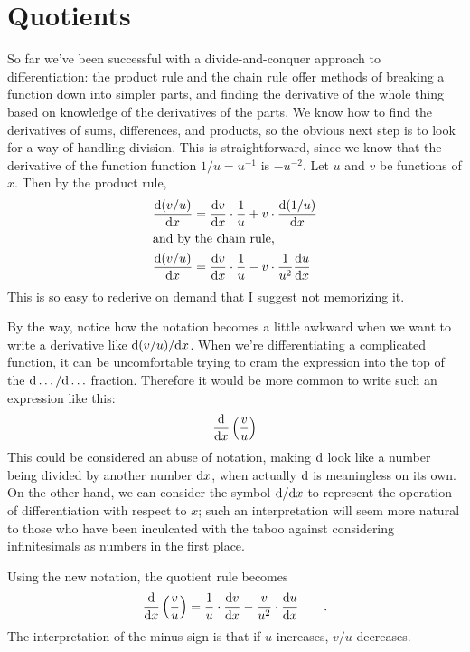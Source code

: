\section{Quotients}

So far we've been successful with a divide-and-conquer approach to differentiation:
the product rule and the chain rule offer methods of breaking a function down into
simpler parts, and finding the derivative of the whole thing based on knowledge of
the derivatives of the parts. We know how to find the derivatives of sums, differences,
and products, so the obvious next step is to look for a way of handling division.
This is straightforward, since we know that the derivative of the function function $1/u=u^{-1}$
is $-u^{-2}$.
Let $u$ and $v$ be functions of $x$. Then by the product rule,
\begin{align*}
  \frac{\textup{d}(v/u)}{\textup{d} x} &= \frac{\textup{d} v}{\textup{d} x}\cdot\frac{1}{u} + v\cdot \frac{\textup{d}(1/u)}{\textup{d} x} \\
\intertext{and by the chain rule,}
  \frac{\textup{d}(v/u)}{\textup{d} x} &= \frac{\textup{d} v}{\textup{d} x}\cdot\frac{1}{u} - v\cdot \frac{1}{u^2}\frac{\textup{d} u}{\textup{d} x}
\end{align*}
This is so easy to rederive on demand that I suggest not memorizing it.

By the way, notice how the notation becomes a little awkward when we want to write a derivative like
$\textup{d}(v/u)/\textup{d} x$. When we're differentiating a complicated function, it can be uncomfortable
trying to cram the expression into the top of the $\textup{d}\ldots/\textup{d}\ldots$ fraction. Therefore
it would be more common to write such an expression like this:
\begin{equation*}
  \frac{\textup{d}}{\textup{d} x} \left(\frac{v}{u}\right)
\end{equation*}
This could be considered an abuse of notation, making $\textup{d}$ look like a number being
divided by another number $\textup{d} x$, when actually $\textup{d}$ is meaningless on its own. On the other hand,
we can consider the symbol $\textup{d}/\textup{d} x$ to represent the operation of differentiation with respect to
$x$; such an interpretation will seem more natural to those who have been inculcated with the taboo
against considering infinitesimals as numbers in the first place.

Using the new notation, the quotient rule becomes
\begin{equation*}
  \frac{\textup{d}}{\textup{d} x} \left(\frac{v}{u}\right) = \frac{1}{u}\cdot\frac{\textup{d} v}{\textup{d} x} - \frac{v}{u^2} \cdot \frac{\textup{d} u}{\textup{d} x} \qquad .
\end{equation*}
The interpretation of the minus sign is that if $u$ increases, $v/u$ decreases.

